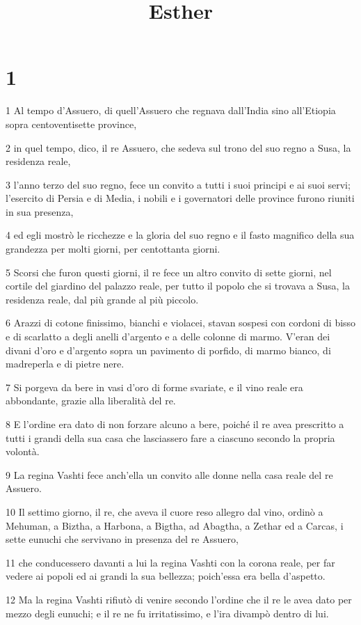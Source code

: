 

\title{Esther}


\chapter{1}

\par 1 Al tempo d'Assuero, di quell'Assuero che regnava dall'India sino all'Etiopia sopra centoventisette province,
\par 2 in quel tempo, dico, il re Assuero, che sedeva sul trono del suo regno a Susa, la residenza reale,
\par 3 l'anno terzo del suo regno, fece un convito a tutti i suoi principi e ai suoi servi; l'esercito di Persia e di Media, i nobili e i governatori delle province furono riuniti in sua presenza,
\par 4 ed egli mostrò le ricchezze e la gloria del suo regno e il fasto magnifico della sua grandezza per molti giorni, per centottanta giorni.
\par 5 Scorsi che furon questi giorni, il re fece un altro convito di sette giorni, nel cortile del giardino del palazzo reale, per tutto il popolo che si trovava a Susa, la residenza reale, dal più grande al più piccolo.
\par 6 Arazzi di cotone finissimo, bianchi e violacei, stavan sospesi con cordoni di bisso e di scarlatto a degli anelli d'argento e a delle colonne di marmo. V'eran dei divani d'oro e d'argento sopra un pavimento di porfido, di marmo bianco, di madreperla e di pietre nere.
\par 7 Si porgeva da bere in vasi d'oro di forme svariate, e il vino reale era abbondante, grazie alla liberalità del re.
\par 8 E l'ordine era dato di non forzare alcuno a bere, poiché il re avea prescritto a tutti i grandi della sua casa che lasciassero fare a ciascuno secondo la propria volontà.
\par 9 La regina Vashti fece anch'ella un convito alle donne nella casa reale del re Assuero.
\par 10 Il settimo giorno, il re, che aveva il cuore reso allegro dal vino, ordinò a Mehuman, a Biztha, a Harbona, a Bigtha, ad Abagtha, a Zethar ed a Carcas, i sette eunuchi che servivano in presenza del re Assuero,
\par 11 che conducessero davanti a lui la regina Vashti con la corona reale, per far vedere ai popoli ed ai grandi la sua bellezza; poich'essa era bella d'aspetto.
\par 12 Ma la regina Vashti rifiutò di venire secondo l'ordine che il re le avea dato per mezzo degli eunuchi; e il re ne fu irritatissimo, e l'ira divampò dentro di lui.
